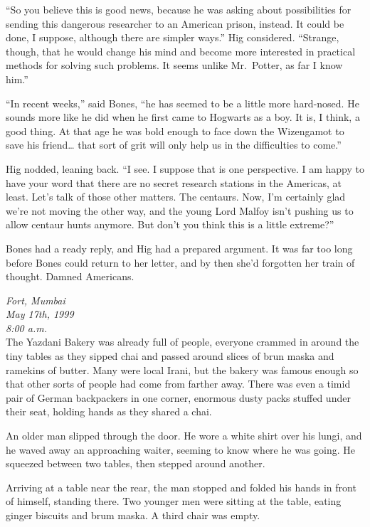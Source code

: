 ``So you believe this is good news, because he was asking about
possibilities for sending this dangerous researcher to an American
prison, instead. It could be done, I suppose, although there are simpler
ways.'' Hig considered. ``Strange, though, that he would change his mind
and become more interested in practical methods for solving such
problems. It seems unlike Mr.~Potter, as far I know him.''

``In recent weeks,'' said Bones, ``he has seemed to be a little more
hard-nosed. He sounds more like he did when he first came to Hogwarts as
a boy. It is, I think, a good thing. At that age he was bold enough to
face down the Wizengamot to save his friend\ldots{} that sort of grit
will only help us in the difficulties to come.''

Hig nodded, leaning back. ``I see. I suppose that is one perspective. I
am happy to have your word that there are no secret research stations in
the Americas, at least. Let's talk of those other matters. The centaurs.
Now, I'm certainly glad we're not moving the other way, and the young
Lord Malfoy isn't pushing us to allow centaur hunts anymore. But don't
you think this is a little extreme?''

Bones had a ready reply, and Hig had a prepared argument. It was far too
long before Bones could return to her letter, and by then she'd
forgotten her train of thought. Damned Americans.

\mybreak

\emph{Fort, Mumbai}\\
\emph{May 17th, 1999}\\
\emph{8:00 a.m.}\\

The Yazdani Bakery was already full of people, everyone crammed in
around the tiny tables as they sipped chai and passed around slices of
brun maska and ramekins of butter. Many were local Irani, but the bakery
was famous enough so that other sorts of people had come from farther
away. There was even a timid pair of German backpackers in one corner,
enormous dusty packs stuffed under their seat, holding hands as they
shared a chai.

An older man slipped through the door. He wore a white shirt over his
lungi, and he waved away an approaching waiter, seeming to know where he
was going. He squeezed between two tables, then stepped around another.

Arriving at a table near the rear, the man stopped and folded his hands
in front of himself, standing there. Two younger men were sitting at the
table, eating ginger biscuits and brum maska. A third chair was empty.

